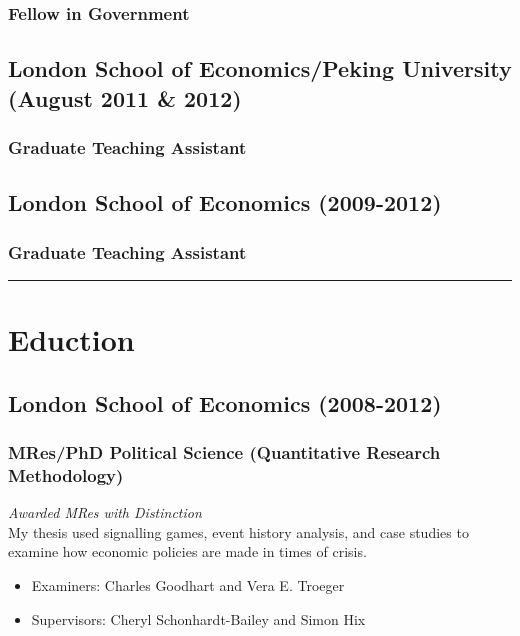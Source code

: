 \documentclass[a4paper]{article}
\begin{document}
\subsubsection*{Fellow in Government}

\subsection*{London School of Economics/Peking University (August 2011 \& 2012)}
\subsubsection*{Graduate Teaching Assistant}

\subsection*{London School of Economics (2009-2012)}
\subsubsection*{Graduate Teaching Assistant}

\vspace{0.25cm}
\medskip\hrule height 1pt
\vspace{0.5cm}


\section*{Eduction}

\subsection*{London School of Economics (2008-2012)}
\subsubsection*{MRes/PhD Political Science (Quantitative Research Methodology)}

\emph{Awarded MRes with Distinction} \\

\noindent My thesis used signalling games, event history analysis, and case studies to examine how economic policies are made in times of crisis.

\begin{itemize}
    \item Examiners: Charles Goodhart and Vera E. Troeger
    \item Supervisors: Cheryl Schonhardt-Bailey and Simon Hix
\end{itemize}
\end{document}
